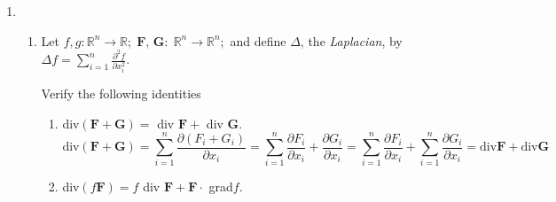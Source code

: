 \documentclass{article}
\newcommand{\divt}{\text{div}}
\begin{document}
\thispagestyle{fancy}
\begin{enumerate}
    \item 
    \begin{enumerate}
        \item Let $f, g: \mathbb{R}^n \rightarrow \mathbb{R}; \; \boldsymbol F,\, \boldsymbol G :\; \mathbb{R}^n \rightarrow \mathbb{R}^n;$ and define $\Delta$, the \textit{Laplacian}, by $\displaystyle \Delta f = \sum_{i=1}^n \frac{\partial^2 f}{\partial x_i^2}$.

        Verify the following identities
        \begin{enumerate}[label=(\roman*)]
            \item div$ (\boldsymbol F + \boldsymbol G) =$ div $\boldsymbol F + $ div $\boldsymbol G$.
            \[ \divt( \boldsymbol F + \boldsymbol G) = \sum_{i=1}^n \frac{\partial (F_i + G_i)}{\partial x_i} = \sum_{i=1}^n \frac{\partial F_i}{\partial x_i} + \frac{\partial G_i}{\partial x_i} = \sum_{i=1}^n \frac{\partial F_i}{\partial x_i} + \sum_{i=1}^n \frac{\partial G_i}{\partial x_i} = \divt \boldsymbol F + \divt \boldsymbol G\]
            \item div$ (f \boldsymbol F ) =f$ div $\boldsymbol F + \boldsymbol F \cdot$ grad$f$.


\end{enumerate}
\end{enumerate}
\end{enumerate}
\end{document}
